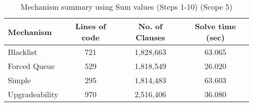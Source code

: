 \begin{table}[htbp]
\centering
\begin{tabular}{|l|c|c|c|}
\hline
\textbf{Mechanism} & \textbf{Lines of code} & \textbf{No. of Clauses} & \textbf{Solve time (sec)} \\
\hline
Blacklist & 721 & 1,828,663 & 63.065 \\
Forced Queue & 529 & 1,818,549 & 26.020 \\
Simple & 295 & 1,814,483 & 63.603 \\
Upgradeability & 970 & 2,516,406 & 36.080 \\
\hline
\end{tabular}
\caption{Mechanism summary using Sum values (Steps 1-10) (Scope 5)}
\label{tab:mechanism_summary_sum_steps_10}
\end{table}
